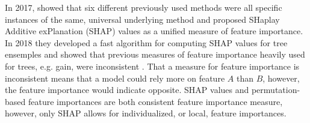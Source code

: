 In 2017, \citet{Lundberg:2017} showed that six different previously used methods were all specific instances of the same, universal underlying method and proposed SHaplay Additive exPlanation (SHAP) values as a unified measure of feature importance. In \num{2018} they developed a fast algorithm for computing SHAP values for tree ensemples and showed that previous measures of feature importance heavily used for trees, e.g. gain, were inconsistent \autocite{lundbergConsistentIndividualizedFeature2019}. That a measure for feature importance is inconsistent means that a model could rely more on feature $A$ than $B$, however, the feature importance would indicate opposite. SHAP values and permutation-based feature importances are both consistent feature importance measure, however, only SHAP allows for individualized, or local, feature importances.  


